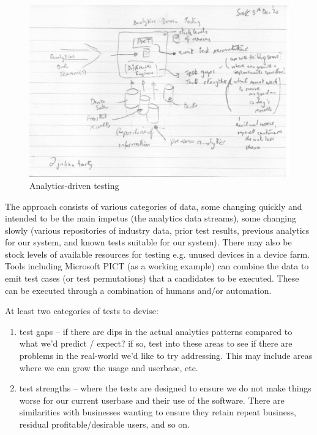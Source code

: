 \begin{figure}[!htbp]
    \centering
    \includegraphics[width=\textwidth]{images/rough-sketches/Analytics-driven-testing-including-PICT.jpeg}
    \caption{Analytics-driven testing}
    \label{fig:roughsketch:analytics-driven-testing-incl-PICT}
\end{figure}

The approach consists of various categories of data, some changing quickly and intended to be the main impetus (the analytics data streams), some changing slowly (various repositories of industry data, prior test results, previous analytics for our system, and known tests suitable for our system). There may also be stock levels of available resources for testing e.g. unused devices in a device farm.
Tools including Microsoft PICT (as a working example) can combine the data to emit test cases (or test permutations) that a candidates to be executed. These can be executed through a combination of humans and/or automation. 

At least two categories of tests to devise:
\begin{enumerate}
    \item test gaps – if there are dips in the actual analytics patterns compared to what we’d predict / expect? if so, test into these areas to see if there are problems in the real-world we’d like to try addressing. This may include areas where we can grow the usage and userbase, etc.
    \item test strengths – where the tests are designed to ensure we do not make things worse for our current userbase and their use of the software. There are similarities with businesses wanting to ensure they retain repeat business, residual profitable/desirable users, and so on.
\end{enumerate}

